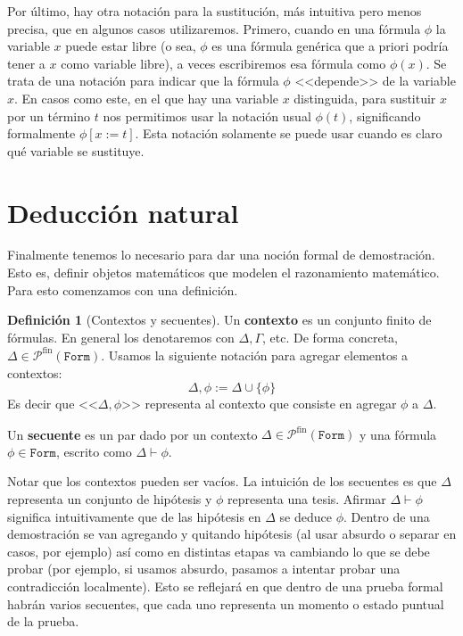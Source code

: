 \documentclass[a4paper, 12pt]{report}
\newcommand{\te}{\text}
\theoremstyle{definition}
\newtheorem{definicion}[teorema]{Definición}
\begin{document}
Por último, hay otra notación para la sustitución, más intuitiva pero menos precisa, que en algunos casos utilizaremos. Primero, cuando en una fórmula $\phi$ la variable $x$ puede estar libre (o sea, $\phi$ es una fórmula genérica que a priori podría tener a $x$ como variable libre), a veces escribiremos esa fórmula como $\phi(x)$. Se trata de una notación para indicar que la fórmula $\phi$ <<depende>> de la variable $x$. En casos como este, en el que hay una variable $x$ distinguida, para sustituir $x$ por un término $t$ nos permitimos usar la notación usual $\phi(t)$, significando formalmente $\phi[x:=t]$. Esta notación solamente se puede usar cuando es claro qué variable se sustituye.

\section{Deducción natural}

Finalmente tenemos lo necesario para dar una noción formal de demostración. Esto es, definir objetos matemáticos que modelen el razonamiento matemático. Para esto comenzamos con una definición.

\begin{definicion}[Contextos y secuentes]
	Un \textbf{contexto} es un conjunto finito de fórmulas. En general los denotaremos con $\Delta,\Gamma$, etc. De forma concreta, $\Delta\in\mathcal{P}^{\te{fin}}(\mathtt{Form})$. Usamos la siguiente notación para agregar elementos a contextos:
	$$ \Delta,\phi:= \Delta\cup\{\phi\} $$
	Es decir que  <<$\Delta,\phi$>> representa al contexto que consiste en agregar $\phi$ a $\Delta$.
	
	Un \textbf{secuente} es un par dado por un contexto $\Delta\in\mathcal{P}^{\te{fin}}(\mathtt{Form})$ y una fórmula $\phi\in\mathtt{Form}$, escrito como $\Delta\vdash\phi$.
\end{definicion}

Notar que los contextos pueden ser vacíos. La intuición de los secuentes es que $\Delta$ representa un conjunto de hipótesis y $\phi$ representa una tesis. Afirmar $\Delta\vdash\phi$ significa intuitivamente que de las hipótesis en $\Delta$ se deduce $\phi$. Dentro de una demostración se van agregando y quitando hipótesis (al usar absurdo o separar en casos, por ejemplo) así como en distintas etapas va cambiando lo que se debe probar (por ejemplo, si usamos absurdo, pasamos a intentar probar una contradicción localmente). Esto se reflejará en que dentro de una prueba formal habrán varios secuentes, que cada uno representa un momento o estado puntual de la prueba.
\end{document}
